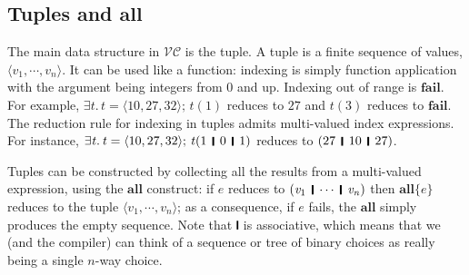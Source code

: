 \documentclass[acmsmall,review,dvipsnames]{acmart}
\newcommand{\Varid}[1]{\mathit{#1}}
\newcommand{\versecalc}{$\mathcal{VC}$}
\begin{document}
\subsection{Tuples and \ensuremath{\textbf{all}}} \label{sec:tuple}
The main data structure in \versecalc{} is the tuple.
A tuple is a finite sequence of values, \ensuremath{\langle{}\Varid{v}_{\mathrm{1}},\cdots,\Varid{v}_{\Varid{n}}\rangle}.
It can be used like a function: indexing is simply function application
with the argument being integers from 0 and up.  Indexing out of range is \ensuremath{\textbf{fail}}.
For example, \ensuremath{\exists\Varid{t}.\,\Varid{t}\mathrel{=}\langle{}\mathrm{10},\mathrm{27},\mathrm{32}\rangle;\,\Varid{t}(\mathrm{1})} reduces to \ensuremath{\mathrm{27}} and \ensuremath{\Varid{t}(\mathrm{3})} reduces to \ensuremath{\textbf{fail}}.
The reduction rule for indexing in tuples admits multi-valued index expressions.
For instance, \ensuremath{\exists\Varid{t}.\,\Varid{t}\mathrel{=}\langle{}\mathrm{10},\mathrm{27},\mathrm{32}\rangle;\,\Varid{t}(\mathrm{1}\hspace{1mm}\mathop{\rule[-0.3mm]{0.5mm}{2.5mm}}\hspace{1mm}\mathrm{0}\hspace{1mm}\mathop{\rule[-0.3mm]{0.5mm}{2.5mm}}\hspace{1mm}\mathrm{1})} reduces to \ensuremath{(\mathrm{27}\hspace{1mm}\mathop{\rule[-0.3mm]{0.5mm}{2.5mm}}\hspace{1mm}\mathrm{10}\hspace{1mm}\mathop{\rule[-0.3mm]{0.5mm}{2.5mm}}\hspace{1mm}\mathrm{27})}.

Tuples can be constructed by collecting all the results from a multi-valued expression, using the \ensuremath{\textbf{all}} construct:
if \ensuremath{\Varid{e}} reduces to \ensuremath{(\Varid{v}_{\mathrm{1}}\hspace{1mm}\mathop{\rule[-0.3mm]{0.5mm}{2.5mm}}\hspace{1mm}\cdots\hspace{1mm}\mathop{\rule[-0.3mm]{0.5mm}{2.5mm}}\hspace{1mm}\Varid{v}_{\Varid{n}})} then \ensuremath{\textbf{all}\{\Varid{e}\}} reduces to
the tuple \ensuremath{\langle{}\Varid{v}_{\mathrm{1}},\cdots,\Varid{v}_{\Varid{n}}\rangle};
as a consequence, if $e$ fails, the \ensuremath{\textbf{all}} simply produces the empty sequence.
Note that \ensuremath{\rule[-0.3mm]{0.5mm}{2.5mm}} is associative, which means that we (and the compiler)
can think of a sequence or tree of binary choices as really being a single
$n$-way choice.
\label{sec:all}
\end{document}
